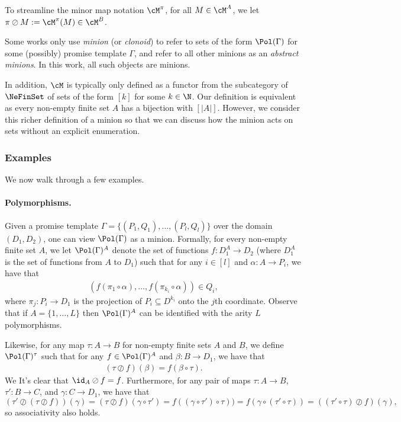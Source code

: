 To streamline the minor map notation $\cM^{\pi}$, for all $M \in \cM^A$, we let $\pi \oslash M := \cM^{\pi}(M) \in \cM^B$.

{
\begin{remark}
Some works only use \emph{minion} (or \emph{clonoid}) to refer to sets of the form $\Pol(\Gamma)$ for some (possibly) promise template $\Gamma$, and refer to all other minions as an \emph{abstract minions}. In this work, all such objects are minions.

In addition, $\cM$ is typically only defined as a functor from the subcategory of $\NeFinSet$ of sets of the form $[k]$ for some $k \in \N$. Our definition is equivalent as every non-empty finite set $A$ has a bijection with $[|A|]$. However, we consider this richer definition of a minion so that we can discuss how the minion acts on sets without an explicit enumeration. 
\end{remark}
}

\subsubsection{{Examples}}

{We now walk through a few examples.}
%
\paragraph{Polymorphisms.} {Given a promise template $\Gamma = \{(P_1, Q_1), \hdots, (P_l, Q_l)\}$ over the domain $(D_1, D_2)$, one can view $\Pol(\Gamma)$ as a minion. Formally, for every non-empty finite set $A$, we let $\Pol(\Gamma)^A$ denote the set of functions $f : D_1^A \to D_2$ (where $D_1^A$ is the set of functions from $A$ to $D_1$) such that for any $i \in [l]$ and $\alpha : A \to P_i$, we have that 
\begin{align}
    (f(\pi_1 \circ \alpha), \hdots, f(\pi_{k_i} \circ \alpha)) \in Q_i,\label{eq:pol-cond}
\end{align}
where $\pi_j : P_i \to D_1$ is the projection of $P_i \subseteq D^{k_i}$ onto the $j$th coordinate. Observe that if $A = \{1,\hdots, L\}$ then $\Pol(\Gamma)^A$ can be identified with the arity $L$ polymorphisms.

Likewise, for any map $\tau : A \to B$ for non-empty finite sets $A$ and $B$, we define $\Pol(\Gamma)^\tau$ such that for any $f \in \Pol(\Gamma)^A$  and $\beta : B \to D_1$, we have that
\begin{align}
    (\tau \oslash f)(\beta) = f(\beta \circ \tau).\label{eq:pol-min}
\end{align}
We It's clear that $\id_{A} \oslash f = f$. Furthermore, for any pair of maps $\tau : A \to B$, $\tau' : B \to C$, and $\gamma : C \to D_1$, we have that
\[
  (\tau' \oslash (\tau \oslash f))(\gamma) = (\tau \oslash f)(\gamma \circ \tau') = f((\gamma \circ \tau') \circ \tau)) = f(\gamma \circ (\tau' \circ \tau)) = ((\tau' \circ \tau) \oslash f)(\gamma),  
\]
so associativity also holds.
}

